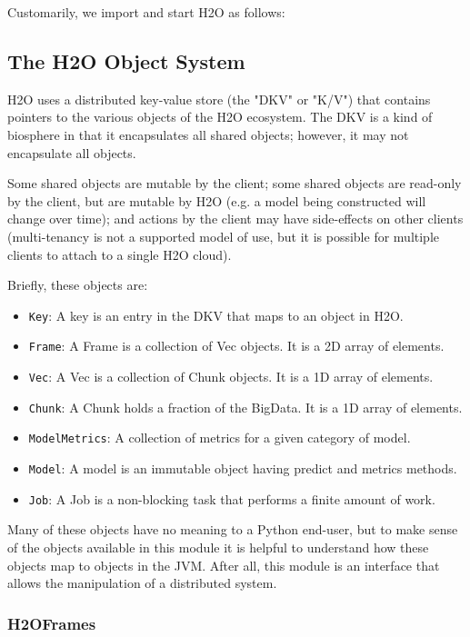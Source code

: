 \waterExampleInPython
Customarily, we import and start H2O as follows:


\subsection{The H2O Object System}

H2O uses a distributed key-value store (the "DKV" or "K/V") that contains pointers to the various objects of the H2O ecosystem. The DKV is a kind of biosphere in that it encapsulates all shared objects; however, it may not encapsulate all objects. 

Some shared objects are mutable by the client; some shared objects are read-only by the client, but are mutable by H2O (e.g. a model being constructed will change over time); and actions by the client may have side-effects on other clients (multi-tenancy is not a supported model of use, but it is possible for multiple clients to attach to a single H2O cloud).

Briefly, these objects are:

\begin{itemize}
\item \texttt{Key}: A key is an entry in the DKV that maps to an object in H2O.
\item \texttt{Frame}: A Frame is a collection of Vec objects. It is a 2D array of elements.
\item \texttt{Vec}: A Vec is a collection of Chunk objects. It is a 1D array of elements.
\item \texttt{Chunk}: A Chunk holds a fraction of the BigData. It is a 1D array of elements.
\item \texttt{ModelMetrics}: A collection of metrics for a given category of model.
\item \texttt{Model}: A model is an immutable object having predict and metrics methods.
\item \texttt{Job}: A Job is a non-blocking task that performs a finite amount of work.
\end{itemize}
Many of these objects have no meaning to a Python end-user, but to make sense of the objects available in this module it is helpful to understand how these objects map to objects in the JVM. After all, this module is an interface that allows the manipulation of a distributed system.


\subsubsection{H2OFrames}

